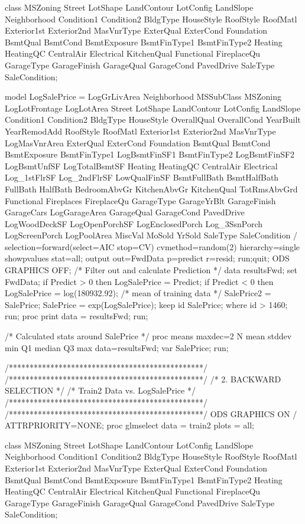 class MSZoning Street LotShape LandContour LotConfig LandSlope Neighborhood 
Condition1 Condition2 BldgType HouseStyle RoofStyle RoofMatl Exterior1st Exterior2nd 
MasVnrType ExterQual ExterCond Foundation BsmtQual BsmtCond BsmtExposure BsmtFinType1 
BsmtFinType2 Heating HeatingQC CentralAir Electrical KitchenQual Functional FireplaceQu 
GarageType GarageFinish GarageQual GarageCond PavedDrive
SaleType SaleCondition; 

model LogSalePrice = LogGrLivArea Neighborhood MSSubClass MSZoning LogLotFrontage LogLotArea 
Street LotShape LandContour LotConfig LandSlope Condition1 Condition2 BldgType HouseStyle 
OverallQual OverallCond YearBuilt YearRemodAdd RoofStyle RoofMatl Exterior1st Exterior2nd 
MasVnrType LogMasVnrArea ExterQual ExterCond Foundation BsmtQual BsmtCond BsmtExposure 
BsmtFinType1 LogBsmtFinSF1 BsmtFinType2 LogBsmtFinSF2 LogBsmtUnfSF LogTotalBsmtSF Heating 
HeatingQC CentralAir Electrical Log_1stFlrSF Log_2ndFlrSF LowQualFinSF BsmtFullBath BsmtHalfBath 
FullBath HalfBath BedroomAbvGr KitchenAbvGr KitchenQual TotRmsAbvGrd 
Functional Fireplaces FireplaceQu GarageType GarageYrBlt GarageFinish GarageCars LogGarageArea 
GarageQual GarageCond PavedDrive LogWoodDeckSF LogOpenPorchSF LogEnclosedPorch Log_3SsnPorch 
LogScreenPorch LogPoolArea MiscVal MoSold YrSold SaleType SaleCondition 
/ selection=forward(select=AIC stop=CV) cvmethod=random(2) hierarchy=single showpvalues stat=all;
output out=FwdData p=predict r=resid;
run;quit;
ODS GRAPHICS OFF; 
/* Filter out and calculate Prediction */
data resultsFwd;
	set FwdData;
	if Predict > 0 then LogSalePrice = Predict;
	if Predict < 0 then LogSalePrice = log(180932.92);  /* mean of training data */
	SalePrice2 = SalePrice;
	SalePrice = exp(LogSalePrice);
	keep id SalePrice;
	where id > 1460;
run;
proc print data = resultsFwd;
run;

/* Calculated stats around SalePrice */
proc means maxdec=2 N mean stddev min Q1 median Q3 max data=resultsFwd;
var SalePrice;
run;

/***********************************************/
/***********************************************/
/*           2. BACKWARD SELECTION             */
/*         Train2 Data vs. LogSalePrice        */
/***********************************************/
/***********************************************/
ODS GRAPHICS ON / ATTRPRIORITY=NONE; 
proc glmselect data = train2 plots = all;  

class MSZoning Street LotShape LandContour LotConfig LandSlope Neighborhood 
Condition1 Condition2 BldgType HouseStyle RoofStyle RoofMatl Exterior1st Exterior2nd 
MasVnrType ExterQual ExterCond Foundation BsmtQual BsmtCond BsmtExposure BsmtFinType1 
BsmtFinType2 Heating HeatingQC CentralAir Electrical KitchenQual Functional FireplaceQu 
GarageType GarageFinish GarageQual GarageCond PavedDrive
SaleType SaleCondition; 

